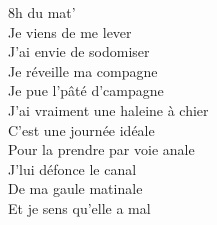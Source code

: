 
 8h du mat'
\\Je viens de me lever
\\J'ai envie de sodomiser
\\Je réveille ma compagne
\\Je pue l'pâté d'campagne
\\J'ai vraiment une haleine à chier
\\C'est une journée idéale
\\Pour la prendre par voie anale
\\J'lui défonce le canal
\\De ma gaule matinale
\\Et je sens qu'elle a mal
